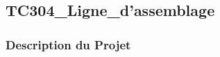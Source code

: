 \documentclass[a4paper,12pt]{report}
\begin{document}
\subsection{TC304\_Ligne\_d'assemblage}
\begin{center}
\label{}
\end{center}
\subsubsection{Description du Projet}
\end{document}
